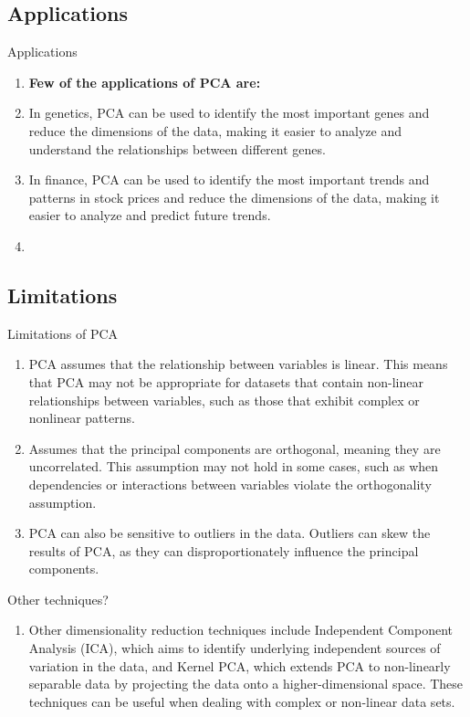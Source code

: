 \documentclass{beamer}
\begin{document}
\subsection{Applications}
\begin{frame}{Applications}
    \begin{enumerate}
        \item \textbf{Few of the applications of PCA are:}
        \item In genetics, PCA can be used to identify the most important genes and reduce the dimensions of the data, making it easier to analyze and understand the relationships between different genes.
        \item In finance, PCA can be used to identify the most important trends and patterns in stock prices and reduce the dimensions of the data, making it easier to analyze and predict future trends.
        \item 
    \end{enumerate}
\end{frame}

\subsection{Limitations}
\begin{frame}{Limitations of PCA}
    \begin{enumerate}
        \item PCA assumes that the relationship between variables is linear. This means that PCA may not be appropriate for datasets that contain non-linear relationships between variables, such as those that exhibit complex or nonlinear patterns.
        \item Assumes that the principal components are orthogonal, meaning they are uncorrelated. This assumption may not hold in some cases, such as when dependencies or interactions between variables violate the orthogonality assumption.
        \item PCA can also be sensitive to outliers in the data. Outliers can skew the results of PCA, as they can disproportionately influence the principal components.
    \end{enumerate}
\end{frame}

\begin{frame}{Other techniques?}
    \begin{enumerate}
        \item Other dimensionality reduction techniques include Independent Component Analysis (ICA), which aims to identify underlying independent sources of variation in the data, and Kernel PCA, which extends PCA to non-linearly separable data by projecting the data onto a higher-dimensional space. These techniques can be useful when dealing with complex or non-linear data sets.
    \end{enumerate}
\end{frame}
\end{document}
